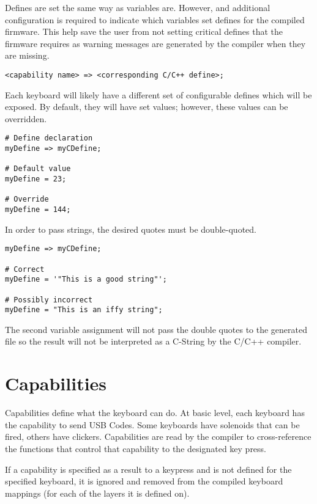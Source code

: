 \documentclass{kiibohd-template}
\begin{document}
Defines are set the same way as variables are.
However, and additional configuration is required to indicate which variables set defines for the compiled firmware.
This help save the user from not setting critical defines that the firmware requires as warning messages are generated by the compiler when they are missing.

\begin{lstlisting}
<capability name> => <corresponding C/C++ define>;
\end{lstlisting}

Each keyboard will likely have a different set of configurable defines which will be exposed.
By default, they will have set values; however, these values can be overridden.

\begin{lstlisting}
# Define declaration
myDefine => myCDefine;

# Default value
myDefine = 23;

# Override
myDefine = 144;
\end{lstlisting}

In order to pass strings, the desired quotes must be double-quoted.

\begin{lstlisting}
myDefine => myCDefine;

# Correct
myDefine = '"This is a good string"';

# Possibly incorrect
myDefine = "This is an iffy string";
\end{lstlisting}

The second variable assignment will not pass the double quotes to the generated file so the result will not be interpreted as a C-String by the C/C++ compiler.


\chapter{Capabilities}
\label{chpt:Capabilities}

Capabilities define what the keyboard can do.
At basic level, each keyboard has the capability to send USB Codes.
Some keyboards have solenoids that can be fired, others have clickers.
Capabilities are read by the compiler to cross-reference the functions that control that capability to the designated key press.

If a capability is specified as a result to a keypress and is not defined for the specified keyboard, it is ignored and removed from the compiled keyboard mappings (for each of the layers it is defined on).
\end{document}
